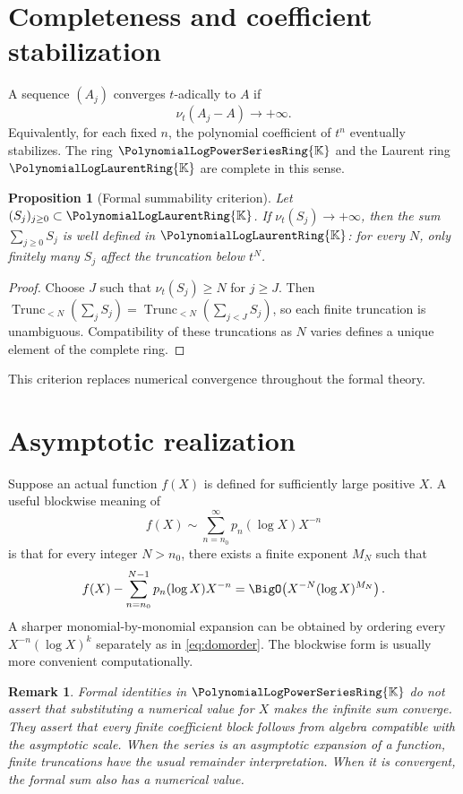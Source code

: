 \documentclass[11pt,oneside,openany]{book}
\newtheorem{proposition}[theorem]{Proposition}
\newtheorem{remark}[theorem]{Remark}
\newcommand{\K}{\mathbb{K}}
\newcommand{\Rring}{\PolynomialLogPowerSeriesRing{\K}}
\newcommand{\Pring}{\PolynomialLogLaurentRing{\K}}
\newcommand{\ordt}{\nu_t}
\newcommand{\TransseriesTruncateBelow}[2]{%
  \operatorname{Trunc}_{<#2}\!\left(#1\right)%
}
\begin{document}
\section{Completeness and coefficient stabilization}
A sequence \((A_j)\) converges \(t\)-adically to \(A\) if
\[
  \ordt(A_j-A)\longrightarrow+\infty.
\]
Equivalently, for each fixed \(n\), the polynomial coefficient of \(t^n\)
eventually stabilizes.  The ring \(\Rring\) and the Laurent ring \(\Pring\) are
complete in this sense.

\begin{proposition}[Formal summability criterion]\label{prop:summability}
Let \((S_j)_{j\geq0}\subset\Pring\).  If
\(\ordt(S_j)\to+\infty\), then the sum \(\sum_{j\geq0}S_j\) is well defined in
\(\Pring\): for every \(N\), only finitely many \(S_j\) affect the truncation
below \(t^N\).
\end{proposition}

\begin{proof}
Choose \(J\) such that \(\ordt(S_j)\geq N\) for \(j\geq J\).  Then
\(\TransseriesTruncateBelow{\sum_jS_j}{N}
=\TransseriesTruncateBelow{\sum_{j<J}S_j}{N}\), so each finite truncation is
unambiguous.  Compatibility of these truncations as \(N\) varies defines a
unique element of the complete ring.
\end{proof}

This criterion replaces numerical convergence throughout the formal theory.

\section{Asymptotic realization}
Suppose an actual function \(f(X)\) is defined for sufficiently large positive
\(X\).  A useful blockwise meaning of
\[
  f(X)\sim\sum_{n=n_0}^{\infty}p_n(\log X)X^{-n}
\]
is that for every integer \(N>n_0\), there exists a finite exponent \(M_N\)
such that
\begin{equation}\label{eq:blockasymp}
  f(X)-\sum_{n=n_0}^{N-1}p_n(\log X)X^{-n}
  =\BigO\!\left(X^{-N}(\log X)^{M_N}\right).
\end{equation}
A sharper monomial-by-monomial expansion can be obtained by ordering every
\(X^{-n}(\log X)^k\) separately as in \cref{eq:domorder}.  The blockwise form is
usually more convenient computationally.

\begin{remark}
Formal identities in \(\Rring\) do not assert that substituting a numerical
value for \(X\) makes the infinite sum converge.  They assert that every finite
coefficient block follows from algebra compatible with the asymptotic scale.
When the series is an asymptotic expansion of a function, finite truncations
have the usual remainder interpretation.  When it is convergent, the formal
sum also has a numerical value.
\end{remark}
\end{document}
